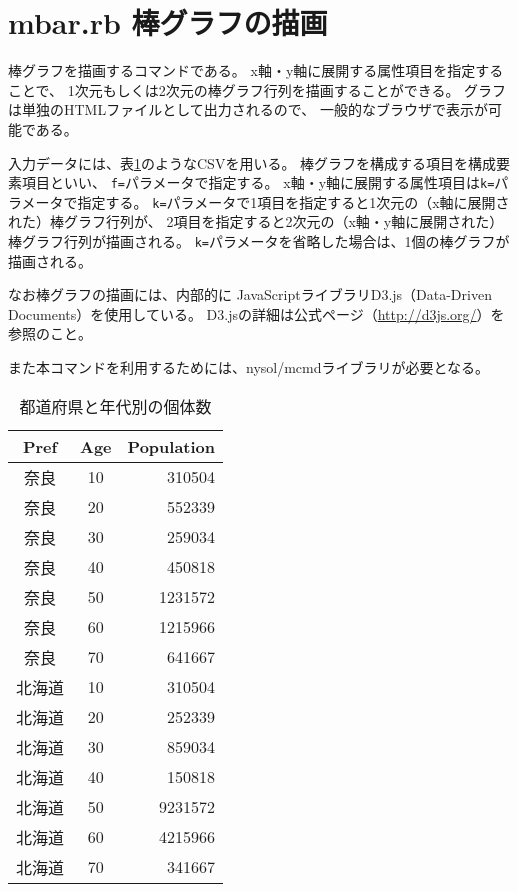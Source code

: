 


\section{mbar.rb 棒グラフの描画\label{sect:mbar}}

棒グラフを描画するコマンドである。
x軸・y軸に展開する属性項目を指定することで、
1次元もしくは2次元の棒グラフ行列を描画することができる。
グラフは単独のHTMLファイルとして出力されるので、
一般的なブラウザで表示が可能である。

入力データには、表\ref{tbl:mbar_input2}のようなCSVを用いる。
棒グラフを構成する項目を構成要素項目といい、
\verb|f=|パラメータで指定する。
x軸・y軸に展開する属性項目は\verb|k=|パラメータで指定する。
\verb|k=|パラメータで1項目を指定すると1次元の（x軸に展開された）棒グラフ行列が、
2項目を指定すると2次元の（x軸・y軸に展開された）棒グラフ行列が描画される。
\verb|k=|パラメータを省略した場合は、1個の棒グラフが描画される。

なお棒グラフの描画には、内部的に
JavaScriptライブラリD3.js（Data-Driven Documents）を使用している。
D3.jsの詳細は公式ページ（\url{http://d3js.org/}）を参照のこと。

また本コマンドを利用するためには、nysol/mcmdライブラリが必要となる。

\begin{table}[http]
\begin{center}
\caption{都道府県と年代別の個体数\label{tbl:mbar_input2}}
{\small
\begin{tabular}[t]{ccr}
\hline
Pref&Age&Population \\
\hline
奈良&10&310504\\
奈良&20&552339\\
奈良&30&259034\\
奈良&40&450818\\
奈良&50&1231572\\
奈良&60&1215966\\
奈良&70&641667\\
北海道&10&310504\\
北海道&20&252339\\
北海道&30&859034\\
北海道&40&150818\\
北海道&50&9231572\\
北海道&60&4215966\\
北海道&70&341667\\
\hline
\end{tabular}
}
\end{center}
\end{table}

